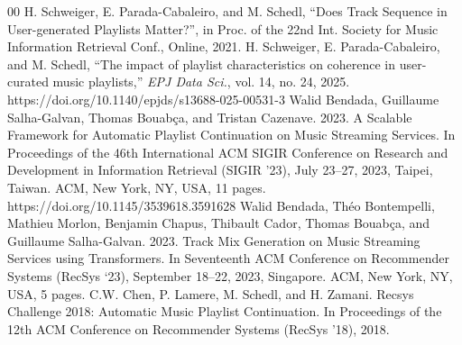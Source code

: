 \documentclass[conference]{IEEEtran}
\begin{document}
\begin{thebibliography}{00}
 H. Schweiger, E. Parada-Cabaleiro, and M.
Schedl, “Does Track Sequence in User-generated Playlists Matter?”, in
Proc. of the 22nd Int. Society for Music Information Retrieval Conf.,
Online, 2021.
 H. Schweiger, E. Parada-Cabaleiro, and M. Schedl, ``The impact of playlist characteristics on coherence in user-curated music playlists,'' \textit{EPJ Data Sci.}, vol. 14, no. 24, 2025. https://doi.org/10.1140/epjds/s13688-025-00531-3
 Walid Bendada, Guillaume Salha-Galvan, Thomas Bouabça, and Tristan
Cazenave. 2023. A Scalable Framework for Automatic Playlist Continuation
on Music Streaming Services. In Proceedings of the 46th International ACM
SIGIR Conference on Research and Development in Information Retrieval
(SIGIR ’23), July 23–27, 2023, Taipei, Taiwan. ACM, New York, NY, USA,
11 pages. https://doi.org/10.1145/3539618.3591628
 Walid Bendada, Théo Bontempelli, Mathieu Morlon, Benjamin Chapus, Thibault Cador, Thomas Bouabça, and Guillaume Salha-Galvan.
2023. Track Mix Generation on Music Streaming Services using Transformers. In Seventeenth ACM Conference on Recommender Systems
(RecSys ‘23), September 18–22, 2023, Singapore. ACM, New York, NY, USA, 5 pages.
 C.W. Chen, P. Lamere, M. Schedl, and H. Zamani. Recsys Challenge 2018: Automatic Music Playlist Continuation. In Proceedings of the 12th ACM Conference on Recommender Systems (RecSys ’18), 2018.

\end{thebibliography}
\end{document}
